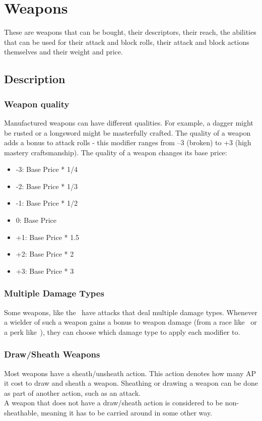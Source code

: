 \chapter{Weapons}\label{ch:weapons}
These are weapons that can be bought, their descriptors, their reach, the abilities that can be used for their attack and block rolls, their attack and block actions themselves and their weight and price.\\
\section{Description}\label{sec:weaponDescription}
\subsection{Weapon quality}\label{subsec:weaponQuality}
Manufactured weapons can have different qualities.
For example, a dagger might be rusted or a longsword might be masterfully crafted.
The quality of a weapon adds a bonus to attack rolls - this modifier ranges from --3 (broken) to +3 (high mastery craftsmanship).
The quality of a weapon changes its base price:\\

\begin{itemize}
    \item -3: Base Price * 1/4
    \item -2: Base Price * 1/3
    \item -1: Base Price * 1/2
    \item 0: Base Price
    \item +1: Base Price * 1.5
    \item +2: Base Price * 2
    \item +3: Base Price * 3
\end{itemize}

\subsection{Multiple Damage Types}\label{subsec:multipleDamageTypeWeapons}
Some weapons, like the~ have attacks that deal multiple damage types.
Whenever a wielder of such a weapon gains a bonus to weapon damage (from a race like~ or a perk like~), they can choose which damage type to apply each modifier to.

\subsection{Draw/Sheath Weapons}\label{subsec:sheathWeapons}
Most weapons have a sheath/unsheath action.
This action denotes how many AP it cost to draw and sheath a weapon.
Sheathing or drawing a weapon can be done as part of another action, such as an attack.\\
A weapon that does not have a draw/sheath action is considered to be non-sheathable, meaning it has to be carried around in some other way.

